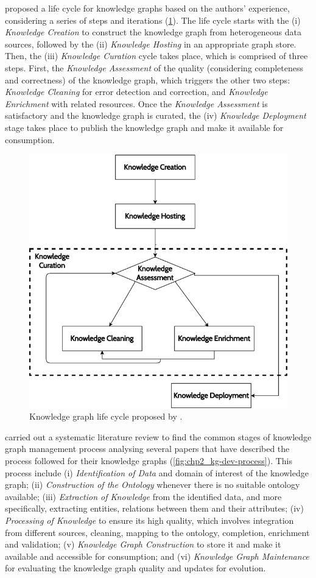 \cite{simsek2021knowledge} proposed a life cycle for knowledge graphs based on the authors' experience, considering a series of steps and iterations (\cref{fig:chp2_lifecycle-Simsek}). The life cycle starts with the 
(i) \textit{Knowledge Creation} to construct the knowledge graph from heterogeneous data sources, followed by the 
(ii) \textit{Knowledge Hosting} in an appropriate graph store. 
Then, the (iii) \textit{Knowledge Curation} cycle takes place, which is comprised of three steps. First, the \textit{Knowledge Assessment} of the quality (considering completeness and correctness) of the knowledge graph, which triggers the other two steps: \textit{Knowledge Cleaning} for error detection and correction, and \textit{Knowledge Enrichment} with related resources. 
Once the \textit{Knowledge Assessment} is satisfactory and the knowledge graph is curated, the (iv) \textit{Knowledge Deployment} stage takes place to publish the knowledge graph and make it available for consumption.

\begin{figure}[]
\centering
\includegraphics[width=0.5\linewidth]{figures/chp2_lifecycle-Simsek.png}
\caption{Knowledge graph life cycle proposed by \cite{simsek2021knowledge}.}
\label{fig:chp2_lifecycle-Simsek}
\end{figure}

\cite{tamavsauskaite2023defining} carried out a systematic literature review to find the common stages of knowledge graph management process analysing several papers that have described the process followed for their knowledge graphs (\cref{fig:chp2_kg-dev-process}). This process include  
(i) \textit{Identification of Data} and domain of interest of the knowledge graph;
(ii) \textit{Construction of the Ontology} whenever there is no suitable ontology available;
(iii) \textit{Extraction of Knowledge} from the identified data, and more specifically, extracting entities, relations between them and their attributes;
(iv) \textit{Processing of Knowledge} to ensure its high quality, which involves integration from different sources, cleaning, mapping to the ontology, completion, enrichment and validation;
(v) \textit{Knowledge Graph Construction} to store it and make it available and accessible for consumption;
and (vi) \textit{Knowledge Graph Maintenance} for evaluating the knowledge graph quality and updates for evolution.


